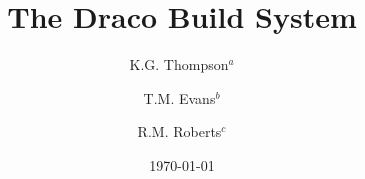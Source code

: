 \documentclass[reqno]{larep}
\begin{document}

\frontmatter

\title{The Draco Build System}
\author{K.G. Thompson$^a$}
\address{$^a$CCS--2, MS D409, Los Alamos National Security, LLC, Los Alamos, NM 87545}

\author{T.M. Evans$^b$}
\address{$^b$currently at ORNL}

\author{R.M. Roberts$^c$}
\address{$^c$D--6, MS F609, Los Alamos National Security, LLC, Los Alamos, NM 87545}

\date{\today}

\end{document}

